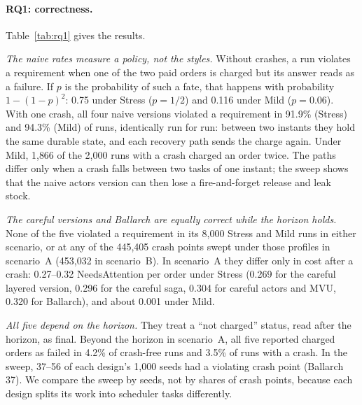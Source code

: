 \documentclass[11pt]{article}
\theoremstyle{definition}
\theoremstyle{plain}
\begin{document}
\paragraph{RQ1: correctness.} Table~\ref{tab:rq1} gives the results.

\emph{The naive rates measure a policy, not the styles.} Without crashes, a run violates a requirement when one of the two paid orders is charged but its answer reads as a failure. If $p$ is the probability of such a fate, that happens with probability $1-(1-p)^2$: 0.75 under Stress ($p=1/2$) and 0.116 under Mild ($p=0.06$). With one crash, all four naive versions violated a requirement in 91.9\% (Stress) and 94.3\% (Mild) of runs, identically run for run: between two instants they hold the same durable state, and each recovery path sends the charge again. Under Mild, 1{,}866 of the 2{,}000 runs with a crash charged an order twice. The paths differ only when a crash falls between two tasks of one instant; the sweep shows that the naive actors version can then lose a fire-and-forget release and leak stock.

\emph{The careful versions and Ballarch are equally correct while the horizon holds.} None of the five violated a requirement in its 8{,}000 Stress and Mild runs in either scenario, or at any of the 445{,}405 crash points swept under those profiles in scenario~A (453{,}032 in scenario~B). In scenario~A they differ only in cost after a crash: 0.27--0.32 \textsf{NeedsAttention} per order under Stress (0.269 for the careful layered version, 0.296 for the careful saga, 0.304 for careful actors and MVU, 0.320 for Ballarch), and about 0.001 under Mild.

\emph{All five depend on the horizon.} They treat a ``not charged'' status, read after the horizon, as final. Beyond the horizon in scenario~A, all five reported charged orders as failed in 4.2\% of crash-free runs and 3.5\% of runs with a crash. In the sweep, 37--56 of each design's 1{,}000 seeds had a violating crash point (Ballarch 37). We compare the sweep by seeds, not by shares of crash points, because each design splits its work into scheduler tasks differently.
\end{document}
